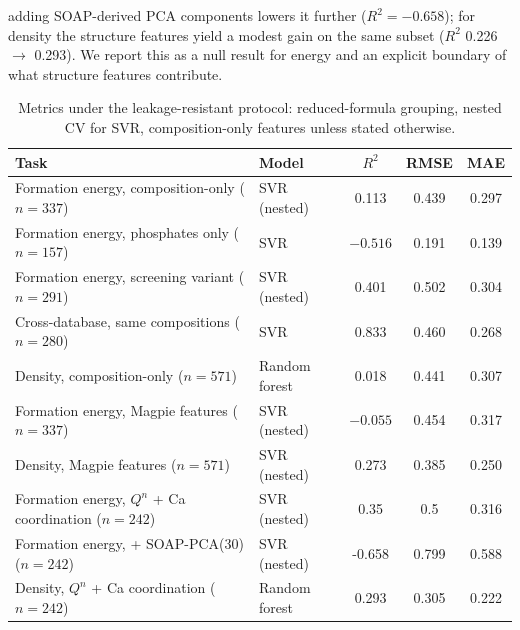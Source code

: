 \documentclass[11pt,a4paper]{article}
\begin{document}
adding SOAP-derived PCA components lowers it further ($R^2 = -0.658$); for density the structure features yield a modest gain on the same subset ($R^2$ 0.226 $\rightarrow$ 0.293). We report this as a null result for energy and an explicit boundary of what structure features contribute.

\begin{table}[ht]
\centering\small
\caption{Metrics under the leakage-resistant protocol: reduced-formula grouping, nested CV for SVR, composition-only features unless stated otherwise.}
\label{tab:ml}
\begin{tabular}{llccc}
\toprule
Task & Model & $R^2$ & RMSE & MAE \\
\midrule
Formation energy, composition-only ($n=337$) & SVR (nested) & 0.113 & 0.439 & 0.297 \\
Formation energy, phosphates only ($n=157$) & SVR & $-0.516$ & 0.191 & 0.139 \\
Formation energy, screening variant ($n=291$) & SVR (nested) & 0.401 & 0.502 & 0.304 \\
Cross-database, same compositions ($n=280$) & SVR & 0.833 & 0.460 & 0.268 \\
Density, composition-only ($n=571$) & Random forest & 0.018 & 0.441 & 0.307 \\
Formation energy, Magpie features ($n=337$) & SVR (nested) & $-0.055$ & 0.454 & 0.317 \\
Density, Magpie features ($n=571$) & SVR (nested) & 0.273 & 0.385 & 0.250 \\
Formation energy, $Q^n$ + Ca coordination ($n=242$) & SVR (nested) & 0.35 & 0.5 & 0.316 \\
Formation energy, + SOAP-PCA(30) ($n=242$) & SVR (nested) & -0.658 & 0.799 & 0.588 \\
Density, $Q^n$ + Ca coordination ($n=242$) & Random forest & 0.293 & 0.305 & 0.222 \\
\bottomrule
\end{tabular}
\end{table}
\end{document}
